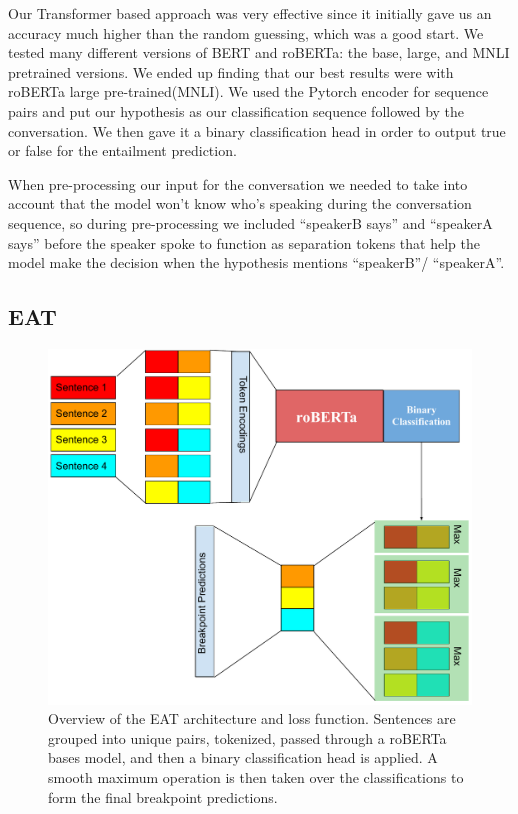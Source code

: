 \documentclass[11pt,a4paper]{article}
\begin{document}
Our Transformer based approach was very effective since it initially gave us an accuracy much higher than the random guessing, which was a good start. We tested many different versions of BERT and roBERTa: the base, large, and MNLI \citep{N18-1101} pretrained versions. We ended up finding that our best results were with roBERTa large pre-trained(MNLI). We used the Pytorch encoder for sequence pairs and put our hypothesis as our classification sequence followed by the conversation. We then gave it a binary classification head in order to output true or false for the entailment prediction.

When pre-processing our input for the conversation we needed to take into account that the model won't know who's speaking during the conversation sequence, so during pre-processing we included “speakerB says” and “speakerA says” before the speaker spoke to function as separation tokens that help the model make the decision when the hypothesis mentions “speakerB”/ “speakerA”.

\subsection{EAT}

\begin{figure}[t]
    \centering
    \includegraphics[width=\linewidth]{assets/eat_diagram.pdf}
    \caption{Overview of the EAT architecture and loss function. Sentences are grouped into unique pairs, tokenized, passed through a roBERTa bases model, and then a binary classification head is applied. A smooth maximum operation is then taken over the classifications to form the final breakpoint predictions.}
\end{figure}
\end{document}
